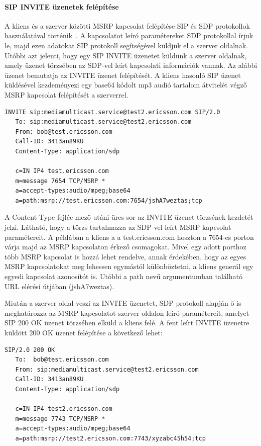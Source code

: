 \paragraph{SIP INVITE üzenetek felépítése\\}
\label{sec:sip_invite}

A kliens és a szerver közötti MSRP kapcsolat felépítése SIP és SDP protokollok használatával történik~\cite{rfc4975}. A kapcsolatot leíró paramétereket SDP protokollal írjuk le, majd ezen adatokat SIP protokoll segítségével küldjük el a szerver oldalnak. Utóbbi azt jelenti, hogy egy SIP INVITE üzenetet küldünk a szerver oldalnak, amely üzenet törzsében az SDP-vel leírt kapcsolati információk vannak. Az alábbi üzenet bemutatja az INVITE üzenet felépítését. A kliens hasonló SIP üzenet küldésével kezdeményezi egy base64 kódolt mp3 audió tartalom átvitelét végző MSRP kapcsolat felépítését a szerverrel.

\fontsize{10}{10}
\begin{verbatim}
INVITE sip:mediamulticast.service@test2.ericsson.com SIP/2.0
   To: sip:mediamulticast.service@test2.ericsson.com
   From: bob@test.ericsson.com
   Call-ID: 3413an89KU
   Content-Type: application/sdp

   c=IN IP4 test.ericsson.com
   m=message 7654 TCP/MSRP *
   a=accept-types:audio/mpeg;base64
   a=path:msrp://test.ericsson.com:7654/jshA7weztas;tcp
\end{verbatim}
\fontsize{12}{12} 

A Content-Type fejléc mező utáni üres sor az INVITE üzenet törzsének kezdetét jelzi. Látható, hogy a  törzs tartalmazza az SDP-vel leírt MSRP kapcsolat paramétereit. A példában a kliens a a test.ericsson.com hoszton a 7654-es porton várja majd az MSRP kapcsolaton érkező csomagokat. Mivel egy adott porthoz több MSRP kapcsolat is hozzá lehet rendelve, annak érdekében, hogy az egyes MSRP kapcsolatokat meg lehessen egymástól különböztetni, a kliens generál egy egyedi kapcsolat azonosítót is. Utóbbi a path nevű argumentumban található URL elérési útjában (jshA7weztas). 

Miután a szerver oldal veszi az INVITE üzenetet, SDP protokoll alapján ő is meghatározza az MSRP kapcsolatot szerver oldalon leíró paramétereit, amelyet SIP 200 OK üzenet törzsében elküld a kliens felé. A fent leírt INVITE üzenetre küldött 200 OK üzenet felépítése a következő lehet:

\fontsize{10}{10}
\begin{verbatim}
SIP/2.0 200 OK
   To:  bob@test.ericsson.com
   From: sip:mediamulticast.service@test2.ericsson.com
   Call-ID: 3413an89KU
   Content-Type: application/sdp

   c=IN IP4 test2.ericsson.com
   m=message 7743 TCP/MSRP *
   a=accept-types:audio/mpeg;base64
   a=path:msrp://test2.ericsson.com:7743/xyzabc45h54;tcp
\end{verbatim}
\fontsize{12}{12} 
 

